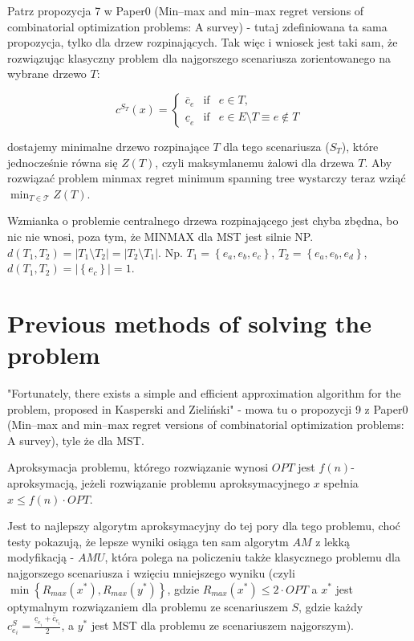 Patrz propozycja 7 w Paper0 (Min–max and min–max regret versions of combinatorial optimization problems: A survey) - tutaj zdefiniowana ta sama propozycja, tylko dla drzew rozpinających. Tak więc i wniosek jest taki sam, że rozwiązując klasyczny problem dla najgorszego scenariusza zorientowanego na wybrane drzewo $T$:

\begin{equation}
c^{S_{T}} \left( x \right) =
\left\{\begin{matrix}
\overline{c}_{e}	&	\textrm{if}	&	e \in T, \\ 
\underline{c}_{e}	&	\textrm{if}	&	e \in E \setminus T \equiv e \notin T
\end{matrix}\right.
\end{equation}

dostajemy minimalne drzewo rozpinające $T$ dla tego scenariusza ($S_{T}$), które jednocześnie równa się $Z \left( T \right)$, czyli maksymlanemu żalowi dla drzewa $T$. Aby rozwiązać problem minmax regret minimum spanning tree wystarczy teraz wziąć $\min_{T \in \mathcal{T}} Z \left( T \right)$.

Wzmianka o problemie centralnego drzewa rozpinającego jest chyba zbędna, bo nic nie wnosi, poza tym, że MINMAX dla MST jest silnie NP. $d \left( T_{1}, T_{2} \right) = \left| T_{1} \setminus T_{2} \right| = \left| T_{2} \setminus T_{1} \right|$. Np. $T_{1} = \left\{ e_{a}, e_{b}, e_{c} \right\}$, $T_{2} = \left\{ e_{a}, e_{b}, e_{d} \right\}$, $d \left( T_{1}, T_{2} \right) = \left| \left\{ e_{c} \right\} \right| = 1$.

\section{Previous methods of solving the problem}


"Fortunately, there exists a simple and efficient approximation algorithm for the
problem, proposed in Kasperski and Zieliński" - mowa tu o propozycji 9 z Paper0 (Min–max and min–max regret versions of combinatorial optimization problems: A survey), tyle że dla MST.

Aproksymacja problemu, którego rozwiązanie wynosi $OPT$ jest $f \left( n \right)$-aproksymacją, jeżeli rozwiązanie problemu aproksymacyjnego $x$ spełnia $x \leqslant f \left( n \right) \cdot OPT$.

Jest to najlepszy algorytm aproksymacyjny do tej pory dla tego problemu, choć testy pokazują, że lepsze wyniki osiąga ten sam algorytm $AM$ z lekką modyfikacją - $AMU$, która polega na policzeniu także klasycznego problemu dla najgorszego scenariusza i wzięciu mniejszego wyniku (czyli $\min \left\{ R_{max} \left( x^{\ast} \right), R_{max} \left( y^{\ast} \right) \right\}$, gdzie $R_{max} \left( x^{\ast} \right) \leqslant 2 \cdot OPT$ a $x^{\ast}$ jest optymalnym rozwiązaniem dla problemu ze scenariuszem $S$, gdzie każdy $c_{e_{i}}^{S} = \frac{\underline{c}_{e_{i}} + \overline{c}_{e_{i}}}{2}$, a $y^{\ast}$ jest MST dla problemu ze scenariuszem najgorszym).

